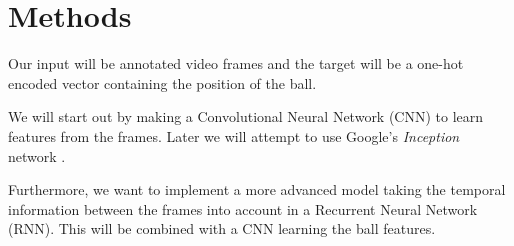 
\section{Methods}
Our input will be annotated video frames and the target will be a one-hot encoded vector containing the position of the ball.

We will start out by making a Convolutional Neural Network (CNN) to learn features from the frames.
Later we will attempt to use Google's \textit{Inception} network \cite{inception}.

Furthermore, we want to implement a more advanced model taking the temporal information between the frames into account in a Recurrent Neural Network (RNN). This will be combined with a CNN learning the ball features.